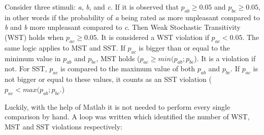 \noindent
%
Consider three stimuli: \textit{a}, \textit{b}, and \textit{c}. If it is observed that $p_{ab} \geq 0.05$ and $p_{bc} \geq 0.05$, in other words if the probability of \textit{a} being rated as more unpleasant compared to \textit{b} and \textit{b} more unpleasant compared to \textit{c}. Then Weak Stochastic Transitivity (WST) holds when $p_{ac} \geq 0.05$. It is considered a WST violation if $p_{ac} < 0.05$. The same logic applies to MST and SST. If $p_{ac}$ is bigger than or equal to the minimum value in $p_{ab}$ and $p_{bc}$, MST holds ($p_{ac}\geq min(p_{ab};p_{bc}$). It is a violation if not. For SST, $p_{ac}$ is compared to the maximum value of both $p_{ab}$ and $p_{bc}$. If $p_{ac}$ is not bigger or equal to these values, it counts as an SST violation ($p_{ac}< max(p_{ab};p_{bc}$.)

Luckily, with the help of Matlab it is not needed to perform every single comparison by hand. A loop was written which identified the number of WST, MST and SST violations respectively:\\
\pagebreak
